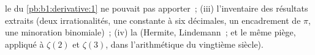 \begin{problem}
\begin{enumerate}[resume]
        le  du
        \cref{pb:b1:derivative:1} ne pouvait pas apporter~; (iii)
        l'inventaire des résultats extraits (deux irrationalités,
        une constante à six décimales, un encadrement de $\pi$, une
        minoration binomiale)~; (iv) la  (Hermite,
        Lindemann~; et le même piège, appliqué à $\zeta(2)$ et
        $\zeta(3)$, dans l'arithmétique du vingtième siècle).
\end{enumerate}
\end{problem}
